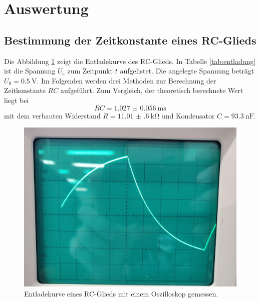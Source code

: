 \section{Auswertung}
\label{sec:Auswertung}

\subsection{Bestimmung der Zeitkonstante eines RC-Glieds}
Die Abbildung \ref{fig:entladung} zeigt die Entladekurve des RC-Glieds.
In Tabelle \ref{tab:entladung} ist die Spannung $U_\text{c}$ zum Zeitpunkt $t$ aufgelistet.
Die angelegte Spannung beträgt $U_0 = \SI{0.5}{\volt}$. Im Folgenden werden drei Methoden
zur Berechnung der Zeitkonstante $RC$ aufgeführt. Zum Vergleich, der theoretisch berechnete Wert liegt bei
\begin{equation*}
    RC = \SI{1.027(56)}{\milli \second}
\end{equation*}
mit dem verbauten Widerstand $R = \SI{11.01(60)}{\kilo \ohm}$ und Kondensator $C = \SI{93.3}{\nano \farad}$.
\begin{figure}
    \centering
    \includegraphics[width=\textwidth]{content/data/entlade.jpg}
    \caption{Entladekurve eines RC-Glieds mit einem Oszilloskop gemessen.}
    \label{fig:entladung}
\end{figure}
